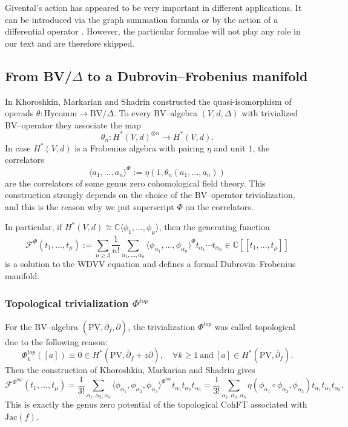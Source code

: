 \documentclass[12pt,a4paper]{amsart}
\newcommand{\CC}{{\mathbb{C}}}
\newcommand{\F}[2]{{F_{#1}^{#2}}}
\newcommand{\Jac}{\mathrm{Jac}}
\def\F{{\mathcal F}}
\newcommand{\p}{{\partial}}
\newcommand{\<}{\left<}
\renewcommand{\>}{\right>}
\newcommand{\PV}{{\mathrm{PV}}}
\numberwithin{equation}{section}
\begin{document}
Givental's action has appeared to be very important in different applications. It can be introduced via the graph summation formula \cite{DbSS} or by the action of a differential operator \cite{G01a, L08}. However, the particular formulae will not play any role in our text and are therefore skipped.

\subsection{From BV/$\Delta$ to a Dubrovin--Frobenius manifold}
In \cite{KMS} Khoroshkin, Markarian and Shadrin constructed the quasi-isomorphism of operads $\theta: \mathrm{Hycomm} \to \mathrm{BV}/\Delta$. To every BV--algebra $(V,d,\Delta)$ with trivialized BV--operator they associate the map
\[
    \theta_n: H^\ast(V,d) ^{\otimes n} \to H^\ast(V,d).
\]
In case $H^\ast(V,d)$ is a Frobenius algebra with pairing $\eta$ and unit $1$, the correlators
\[
    \langle a_1,\dots,a_n \rangle^\Phi := \eta\left(1, \theta_n(a_1,\dots,a_n) \right)
\]
are the correlators of some genus zero cohomological field theory. This construction strongly depends on the choice of the BV--operator trivialization, and this is the reason why we put superscript $\Phi$ on the correlators.

In particular, if $H^\ast(V,d) \cong \CC \langle \phi_1,\dots, \phi_\mu \rangle$, then the generating function
\[
    \F^\Phi(t_1,\dots,t_\mu) := \sum_{n \ge 3} \frac{1}{n!} \sum_{\alpha_1,\dots,\alpha_n} \langle \phi_{\alpha_1},\dots,\phi_{\alpha_n} \rangle^\Phi t_{\alpha_1}\cdots t_{\alpha_n} \in \CC[[t_1,\dots,t_\mu]]
\]
is a solution to the WDVV equation and defines a formal Dubrovin--Frobenius manifold.

\subsubsection{Topological trivialization $\Phi^{top}$}
For the BV--algebra $(\PV,\overline{\p}_f,\p)$, the trivialization $\Phi^{top}$ was called topological due to the following reason:
\[
    \Phi_k^{top} ([a]) \equiv 0 \in H^\ast(\PV,\overline\p_f + z \p), \quad \forall k \ge 1 \ \text{and} \ [a] \in H^\ast(\PV,\overline{\p}_f).
\]
Then the construction of Khoroshkin, Markarian and Shadrin gives
\[
    \F^{\Phi^{top}}(t_1,\dots,t_\mu) = \frac{1}{3!} \sum_{\alpha_1,\alpha_2,\alpha_3} \langle \phi_{\alpha_1},\phi_{\alpha_2},\phi_{\alpha_3} \rangle^{\Phi^{top}} t_{\alpha_1}t_{\alpha_2}t_{\alpha_3}
    = \frac{1}{3!} \sum_{\alpha_1,\alpha_2,\alpha_3} \eta (\phi_{\alpha_1} \circ \phi_{\alpha_2},\phi_{\alpha_3}) t_{\alpha_1}t_{\alpha_2}t_{\alpha_3}.
\]
This is exactly the genus zero potential of the topological CohFT associated with $\Jac(f)$.
\end{document}
